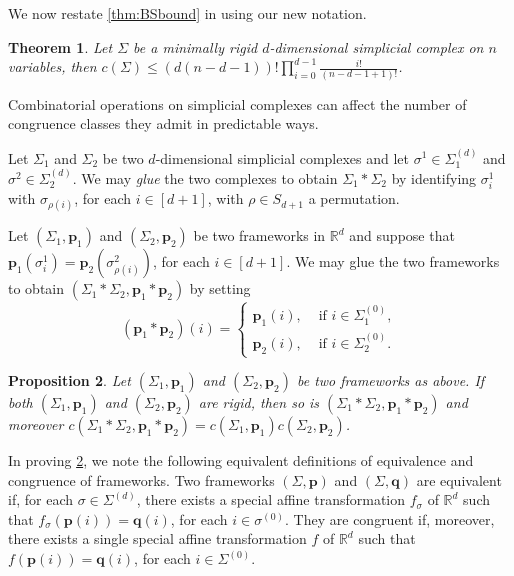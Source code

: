 \documentclass[11pt]{amsart}
\newtheorem{theorem}{Theorem}[section]
\newtheorem{proposition}[theorem]{Proposition}
\theoremstyle{definition}
\theoremstyle{remark}
\newcommand*{\defn}[1]{{\color{purple}\textit{#1}}}
\begin{document}
We now restate \cref{thm:BSbound} in using our new notation.

\begin{theorem}\cite{borcea2012realizations}
    Let $\Sigma$ be a minimally rigid $d$-dimensional simplicial complex on $n$ variables, then $c(\Sigma) \leq (d(n-d-1))!\prod\limits_{i=0}^{d-1}\frac{i!}{(n-d-1+1)!}$.
\end{theorem}

Combinatorial operations on simplicial complexes can affect the number of congruence classes they admit in predictable ways.

Let $\Sigma_1$ and $\Sigma_2$ be two $d$-dimensional simplicial complexes and let $\sigma^1\in\Sigma_1^{(d)}$ and $\sigma^2\in\Sigma_2^{(d)}$.
We may \defn{glue} the two complexes to obtain $\Sigma_1*\Sigma_2$ by identifying $\sigma_i^1$ with $\sigma_{\rho(i)}$, for each $i\in[d+1]$, with $\rho\in S_{d+1}$ a permutation.

Let $(\Sigma_1,\mathbf{p}_1)$ and $(\Sigma_2,\mathbf{p}_2)$ be two frameworks in $\mathbb{R}^d$ and suppose that $\mathbf{p}_1(\sigma_i^1)=\mathbf{p}_2(\sigma_{\rho(i)}^2)$, for each $i\in [d+1]$.
We may glue the two frameworks to obtain $(\Sigma_1*\Sigma_2,\mathbf{p}_1*\mathbf{p}_2)$ by setting
\begin{equation*}
    (\mathbf{p}_1*\mathbf{p}_2)(i) = \begin{cases}
        \mathbf{p}_1(i),&\text{ if }i\in\Sigma_1^{(0)},\\
        \mathbf{p}_2(i),&\text{ if }i\in\Sigma_2^{(0)}.
    \end{cases}
\end{equation*}

\begin{proposition}\label{prop:gluing}
    Let $(\Sigma_1,\mathbf{p}_1)$ and $(\Sigma_2,\mathbf{p}_2)$ be two frameworks as above.
    If both $(\Sigma_1,\mathbf{p}_1)$ and $(\Sigma_2,\mathbf{p}_2)$ are rigid, then so is $(\Sigma_1*\Sigma_2,\mathbf{p}_1*\mathbf{p}_2)$ and moreover $c(\Sigma_1*\Sigma_2,\mathbf{p}_1*\mathbf{p}_2) = c(\Sigma_1,\mathbf{p}_1)c(\Sigma_2,\mathbf{p}_2)$.
\end{proposition}

In proving \cref{prop:gluing}, we note the following equivalent definitions of equivalence and congruence of frameworks.
Two frameworks $(\Sigma,\mathbf{p})$ and $(\Sigma,\mathbf{q})$ are equivalent if, for each $\sigma\in\Sigma^{(d)}$, there exists a special affine transformation $f_{\sigma}$ of $\mathbb{R}^d$ such that $f_{\sigma}(\mathbf{p}(i))=\mathbf{q}(i)$, for each $i\in\sigma^{(0)}$.
They are congruent if, moreover, there exists a single special affine transformation $f$ of $\mathbb{R}^d$ such that $f(\mathbf{p}(i))=\mathbf{q}(i)$, for each $i\in\Sigma^{(0)}$.
\end{document}

